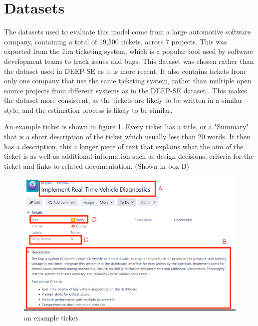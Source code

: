 \documentclass{UoYCSproject}
\begin{document}
    \section{Datasets}\label{sec:datasets}
    The datasets used to evaluate this model come from a large automotive software company, containing a total of 19,500 tickets, across 7 projects.
    This was exported from the Jira ticketing system, which is a popular tool used by software development teams to track issues and bugs.
    This dataset was chosen rather than the dataset used in DEEP-SE as it is more recent. It also contains tickets from only one company that use the same ticketing system, rather than multiple open source projects from different systems as in the DEEP-SE dataset \cite{8255666}. This makes the dataset more consistent, as the tickets are likely to be written in a similar style, and the estimation process is likely to be similar. \par
    An example ticket is shown in figure \ref{fig:ticket}.
    Every ticket has a title, or a "Summary" that is a short description of the ticket which usually less than 20 words.
    It then has a description, this a longer piece of text that explains what the aim of the ticket is as well as additional information such as design decisions, criteria for the ticket and links to related documentation. (Shown in box B) \par

    \begin{figure}[h]
        \includegraphics[width=\textwidth]{./figures/dummy-ticket}
        \caption{an example ticket}
        \label{fig:ticket}
    \end{figure}
\end{document}
